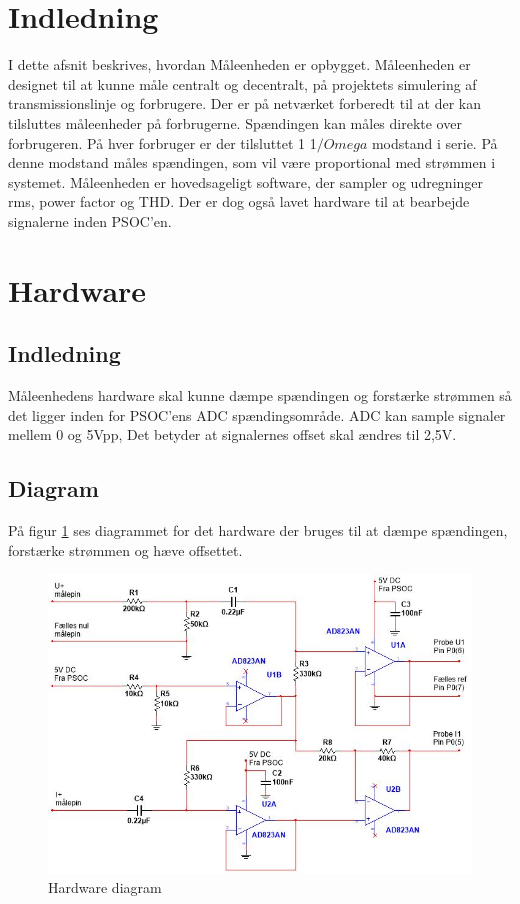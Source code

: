 
\section{Indledning}
I dette afsnit beskrives, hvordan Måleenheden er opbygget. Måleenheden er designet til at kunne måle centralt og decentralt, på projektets simulering af transmissionslinje og forbrugere. Der er på netværket forberedt til at der kan tilsluttes måleenheder på forbrugerne. Spændingen kan måles direkte over forbrugeren. På hver forbruger er der tilsluttet 1 1$/Omega$ modstand i serie. På denne modstand måles spændingen, som vil være proportional med strømmen i systemet. Måleenheden er hovedsageligt software, der sampler og udregninger rms, power factor og THD. Der er dog også lavet hardware til at bearbejde signalerne inden PSOC'en.


\section{Hardware}
\subsection{Indledning}
Måleenhedens hardware skal kunne dæmpe spændingen og forstærke strømmen så det ligger inden for PSOC'ens ADC spændingsområde. ADC kan sample signaler mellem 0 og 5Vpp, Det betyder at signalernes offset skal ændres til 2,5V.

\subsection{Diagram}
På figur \ref{fig:MaalDiagram} ses diagrammet for det hardware der bruges til at dæmpe spændingen, forstærke strømmen og hæve offsettet.

\begin{figure}[H] %
	\centering
	\includegraphics[width=\textwidth]{Figure/MaalHardware}
	\caption{Hardware diagram}
	\label{fig:MaalDiagram}
\end{figure}


